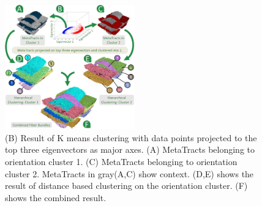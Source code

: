 \begin{figure}[tb] 
  \centering  	
  \includegraphics[width=0.5\textwidth]{images_pvis/figure6.png}
  	\caption{(B) Result of K means clustering with data points projected to the top three eigenvectors as major axes. (A) MetaTracts belonging to orientation cluster 1. (C) MetaTracts belonging to orientation cluster 2. MetaTracts in gray(A,C) show context.
  	(D,E) shows the result of distance based clustering on the orientation cluster. (F) shows the combined result. }
  \label{fig:orientation_clustering}
  \end{figure}

